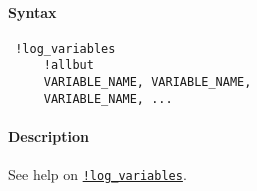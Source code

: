 


	\paragraph{Syntax}
 
 \begin{verbatim}
 !log_variables
     !allbut
     VARIABLE_NAME, VARIABLE_NAME, 
     VARIABLE_NAME, ...
 \end{verbatim}
 
 \paragraph{Description}
 
 See help on \href{modellang/logvariables}{\texttt{!log\_variables}}.


